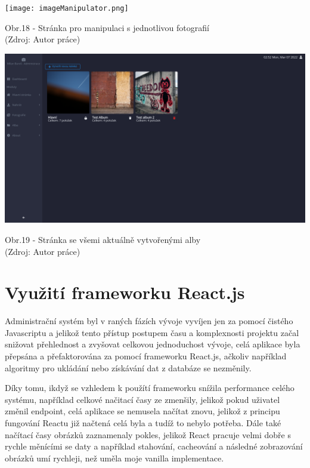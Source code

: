 \documentclass[12pt,a4paper]{report}
\begin{document}
  \vspace*{0.5cm}
  \noindent\texttt{[image: imageManipulator.png]}
  \begin{center}
    Obr.18 - Stránka pro manipulaci s jednotlivou fotografií \\
    (Zdroj: Autor práce)
  \end{center}
  \vspace*{0.5cm}

  \vspace*{0.5cm}
  \noindent\includegraphics[width=\linewidth]{albums.png}
  \begin{center}
    Obr.19 -  Stránka se všemi aktuálně vytvořenými alby \\
    (Zdroj: Autor práce)
  \end{center}
  \vspace*{0.5cm}

  \section{Využití frameworku React.js}
  Administrační systém byl v raných fázích vývoje vyvíjen jen za pomocí čistého Javascriptu a
  jelikož tento přístup postupem času a komplexnosti projektu začal snižovat přehlednost a zvyšovat 
  celkovou jednoduchost vývoje, celá aplikace byla přepsána a přefaktorována za pomocí 
  frameworku React.js, ačkoliv například algoritmy pro ukládání nebo získávání dat z databáze se nezměnily.
  
  Díky tomu, ikdyž se vzhledem k použítí frameworku snížila performance celého systému, například celkové
  načitací časy ze zmenšily, jelikož pokud uživatel změnil endpoint, celá aplikace se nemusela načítat znovu, jelikož
  z principu fungování Reactu již načtená celá byla a tudíž to nebylo potřeba. Dále také načítací časy obrázků zaznamenaly pokles,
  jelikož React pracuje velmi dobře s rychle měnícími se daty a například stahování, cacheování a následné zobrazování obrázků umí 
  rychleji, než uměla moje vanilla implementace.
  
\end{document}

